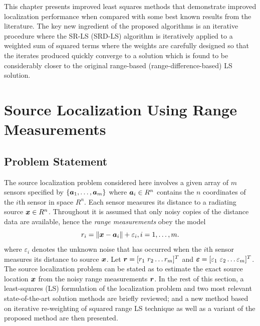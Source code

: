 This chapter presents improved least squares methods that demonstrate improved localization performance when compared with some best known results from the literature. The key new ingredient of the proposed algorithms is an iterative procedure where the SR-LS (SRD-LS) algorithm is iteratively applied to a weighted sum of squared terms where the weights are carefully designed so that the iterates produced quickly converge to a solution which is found to be considerably closer to the original range-based (range-difference-based) LS solution. %



\section{Source Localization Using Range Measurements}%
\subsection{Problem Statement}%


The source localization problem considered here involves a given array of $m$ sensors specified by $\{\mbox{\boldmath$a$}_1,\ldots, \mbox{\boldmath$a$}_m\}$ where $\mbox{\boldmath$a$}_i\in R^n$  contains the $n$ coordinates of the $i$th sensor in space $R^n$. Each sensor measures its distance to a radiating source $\mbox{\boldmath$x$}\in R^n$. Throughout it is assumed that only noisy copies of the distance data are available, hence the \textit{range measurements} obey the model
\begin{equation} \label{eq:3.1}
\setcounter{equation}{1}
r_i = \|{\Bx} - {\Ba}_i\| + \varepsilon_i, i = 1,\ldots , m.
\end{equation}                                                                                                     	where $\varepsilon_i$ denotes the unknown noise that has occurred when the $i$th sensor measures its distance to source $\mbox{\boldmath$x$}$. Let $\mbox{\boldmath$r$}=[r_1 \ r_2 \ldots r_m]^T$ and $\mbox{\boldmath${\varepsilon}$}=[\varepsilon_1 \ \varepsilon_2 \ldots \varepsilon_m]^T$. The source localization problem can be stated as to estimate the exact source location $\mbox{\boldmath$x$}$ from the noisy range measurements $\mbox{\boldmath$r$}$. In the rest of this section, a least-squares (LS) formulation of the localization problem and two most relevant state-of-the-art solution methods are briefly reviewed; and a new method based on iterative re-weighting of squared range LS technique as well as a variant of the proposed method are then presented. %

